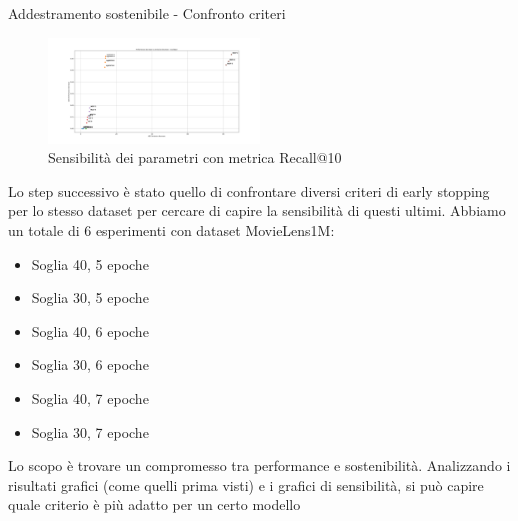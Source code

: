 \begin{frame}{Addestramento sostenibile - Confronto criteri}
    \begin{figure}
        \centering
        \includegraphics[width=0.5\textwidth]{images/sensibility_recall@10.png}
        \caption{Sensibilità dei parametri con metrica Recall@10}
    \end{figure}
    \scriptsize 
    Lo step successivo è stato quello di confrontare diversi criteri di early stopping per lo stesso dataset per cercare di capire la sensibilità di questi ultimi. Abbiamo un totale di 6 esperimenti con dataset MovieLens1M:
    \begin{itemize}
        \item Soglia 40, 5 epoche
        \item Soglia 30, 5 epoche
        \item Soglia 40, 6 epoche
        \item Soglia 30, 6 epoche
        \item Soglia 40, 7 epoche
        \item Soglia 30, 7 epoche
\end{itemize}
Lo scopo è trovare un compromesso tra performance e sostenibilità. Analizzando i risultati grafici (come quelli prima visti) e i grafici di sensibilità, si può capire quale criterio è più adatto per un certo modello
\end{frame}



